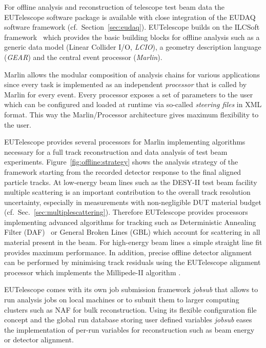 

For offline analysis and reconstruction of telescope test beam data the EUTelescope software package \cite{ref:eutelwebsite} is available with close integration of the EUDAQ software framework (cf.~Section~\ref{sec:eudaq}).
EUTelescope builds on the ILCSoft framework~\cite{ref:eudetmemo_2009_12} which provides the basic building blocks for offline analysis such as a generic data model (Linear Collider I/O, \emph{LCIO}),
a geometry description language (\emph{GEAR}) and the central event processor (\emph{Marlin}).

Marlin allows the modular composition of analysis chains for various applications since every task is implemented as an independent \emph{processor} that is called by Marlin for every event. 
Every processor exposes a set of parameters to the user which can be configured and loaded at runtime via so-called \emph{steering files} in XML format.
This way the Marlin/Processor architecture gives maximum flexibility to the user.

EUTelescope provides several processors for Marlin implementing algorithms necessary for a full track reconstruction and data analysis of test beam experiments. 
Figure~\ref{fig:offline:strategy} shows the analysis strategy of the framework starting from the recorded detector response to the final aligned particle tracks. 
At low-energy beam lines such as the DESY-II test beam facility multiple scattering is an important contribution to the overall track resolution uncertainty, especially in measurements with non-negligible DUT material budget (cf.\ Sec.~\ref{sec:multiplescattering}).
Therefore EUTelescope provides processors implementing advanced algorithms for tracking such as Deterministic Annealing Filter (DAF)~\cite{ref:daffitter} or General Broken Lines (GBL) \cite{Kleinwort-2012} which account for scattering in all material present in the beam.
For high-energy beam lines a simple straight line fit provides maximum performance.
In addition, precise offline detector alignment can be performed by minimising track residuals using the EUTelescope alignment processor which implements the Millipede-II algorithm \cite{Blobel-2006}.

EUTelescope comes with its own job submission framework \emph{jobsub} that allows to run analysis jobs on local machines or to submit them to larger computing clusters such as NAF for bulk reconstruction.
Using its flexible configuration file concept and the global run database storing user defined variables \emph{jobsub} eases the implementation of per-run variables for reconstruction such as beam energy or detector alignment.

